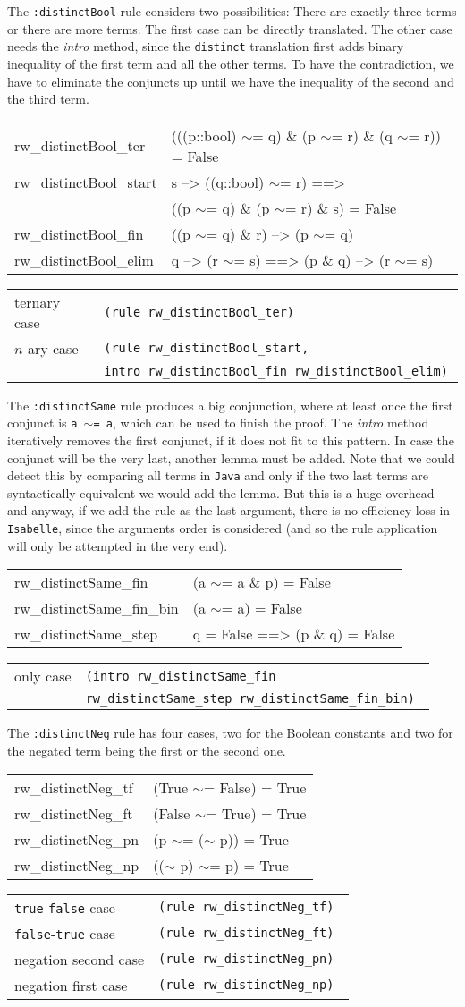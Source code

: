 \documentclass[10pt,a4paper]{article}
\newcommand{\isa}{\texttt{Isabelle}\xspace}
\newcommand{\jav}{\texttt{Java}\xspace}
\newcommand{\ttt}{\texttt}
\newcommand{\negat}{\ensuremath{\sim}}
\newcommand{\nega}{\negat\xspace}
\newcommand{\true}{\ttt{true}\xspace}
\newcommand{\false}{\ttt{false}\xspace}
\newenvironment{pt}[1]{\begin{center}\begin{tt}\begin{tabular}{#1}\hline}{\end{tabular}\end{tt}\end{center}}
\newcommand{\pl}[1]{#1 \\[1mm]}
\newcommand{\pll}[1]{#1 \\\hline}
\newenvironment{rt}{\begin{center}\begin{tabular}{|l l|}\hline}{\end{tabular}\end{center}}
\newcommand{\rl}[2]{\rm{#1} & \tt{#2} \\[1mm]}
\newcommand{\rll}[2]{\rm{#1} & \tt{#2} \\\hline}
\def\ind{\quad}
\begin{document}
The \ttt{:distinctBool} rule considers two possibilities: There are exactly three terms or there are more terms. The first case can be directly translated. The other case needs the \emph{intro} method, since the \ttt{distinct} translation first adds binary inequality of the first term and all the other terms. To have the contradiction, we have to eliminate the conjuncts up until we have the inequality of the second and the third term.
%
\begin{pt}{ll}
	\pl{rw\_distinctBool\_ter & (((p::bool) \negat= q) \& (p \negat= r) \& (q \negat= r)) = False}
	\pl{rw\_distinctBool\_start & s --> ((q::bool) \negat= r) ==>}
		\pl{& \ind ((p \negat= q) \& (p \negat= r) \& s) = False}
	\pl{rw\_distinctBool\_fin & ((p \negat= q) \& r) --> (p \negat= q)}
	\pll{rw\_distinctBool\_elim & q --> (r \negat= s) ==> (p \& q) --> (r \negat= s)}
\end{pt}
%
\begin{rt}
	\rl{ternary case}{(rule rw\_distinctBool\_ter)}
	\rl{$n$-ary case}{(rule rw\_distinctBool\_start,}
	\rll{}{\ind intro rw\_distinctBool\_fin rw\_distinctBool\_elim)}
\end{rt}

The \ttt{:distinctSame} rule produces a big conjunction, where at least once the first conjunct is \ttt{a \negat= a}, which can be used to finish the proof. The \emph{intro} method iteratively removes the first conjunct, if it does not fit to this pattern. In case the conjunct will be the very last, another lemma must be added. Note that we could detect this by comparing all terms in \jav and only if the two last terms are syntactically equivalent we would add the lemma. But this is a huge overhead and anyway, if we add the rule as the last argument, there is no efficiency loss in \isa, since the arguments order is considered (and so the rule application will only be attempted in the very end).
%
\begin{pt}{ll}
	\pl{rw\_distinctSame\_fin & (a \negat= a \& p) = False}
	\pl{rw\_distinctSame\_fin\_bin & (a \negat= a) = False}
	\pll{rw\_distinctSame\_step & q = False ==> (p \& q) = False}
\end{pt}
%
\begin{rt}
	\rl{only case}{(intro rw\_distinctSame\_fin}
		\rll{}{\ind rw\_distinctSame\_step rw\_distinctSame\_fin\_bin)}
\end{rt}

The \ttt{:distinctNeg} rule has four cases, two for the Boolean constants and two for the negated term being the first or the second one.
%
\begin{pt}{ll}
	\pl{rw\_distinctNeg\_tf & (True \negat= False) = True}
	\pl{rw\_distinctNeg\_ft & (False \negat= True) = True}
	\pl{rw\_distinctNeg\_pn & (p \negat= (\nega p)) = True}
	\pll{rw\_distinctNeg\_np & ((\nega p) \negat= p) = True}
\end{pt}
%
\begin{rt}
	\rl{\true-\false case}{(rule rw\_distinctNeg\_tf)}
	\rl{\false-\true case}{(rule rw\_distinctNeg\_ft)}
	\rl{negation second case}{(rule rw\_distinctNeg\_pn)}
	\rll{negation first case}{(rule rw\_distinctNeg\_np)}
\end{rt}
\end{document}
